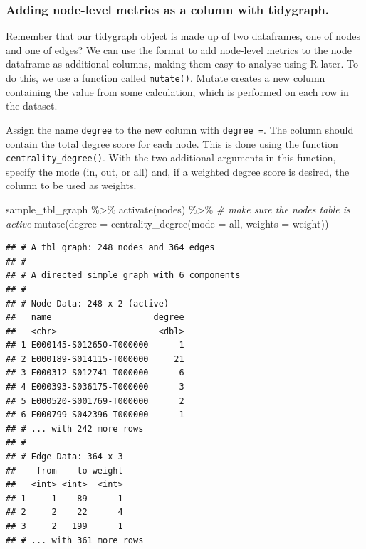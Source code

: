\documentclass[
]{book}
\newenvironment{Shaded}{\begin{snugshade}}{\end{snugshade}}
\newcommand{\AttributeTok}[1]{\textcolor[rgb]{0.77,0.63,0.00}{#1}}
\newcommand{\CommentTok}[1]{\textcolor[rgb]{0.56,0.35,0.01}{\textit{#1}}}
\newcommand{\FunctionTok}[1]{\textcolor[rgb]{0.00,0.00,0.00}{#1}}
\newcommand{\NormalTok}[1]{#1}
\newcommand{\SpecialCharTok}[1]{\textcolor[rgb]{0.00,0.00,0.00}{#1}}
\newcommand{\StringTok}[1]{\textcolor[rgb]{0.31,0.60,0.02}{#1}}
\begin{document}
\hypertarget{adding-node-level-metrics-as-a-column-with-tidygraph.}{%
\subsubsection{Adding node-level metrics as a column with tidygraph.}\label{adding-node-level-metrics-as-a-column-with-tidygraph.}}

Remember that our tidygraph object is made up of two dataframes, one of nodes and one of edges? We can use the format to add node-level metrics to the node dataframe as additional columns, making them easy to analyse using R later. To do this, we use a function called \texttt{mutate()}. Mutate creates a new column containing the value from some calculation, which is performed on each row in the dataset.

Assign the name \texttt{degree} to the new column with \texttt{degree\ =}. The column should contain the total degree score for each node. This is done using the function \texttt{centrality\_degree()}. With the two additional arguments in this function, specify the mode (in, out, or all) and, if a weighted degree score is desired, the column to be used as weights.

\begin{Shaded}
\begin{Highlighting}[]
\NormalTok{sample\_tbl\_graph }\SpecialCharTok{\%\textgreater{}\%} 
  \FunctionTok{activate}\NormalTok{(nodes) }\SpecialCharTok{\%\textgreater{}\%} \CommentTok{\# make sure the nodes table is active}
  \FunctionTok{mutate}\NormalTok{(}\AttributeTok{degree =} \FunctionTok{centrality\_degree}\NormalTok{(}\AttributeTok{mode =} \StringTok{\textquotesingle{}all\textquotesingle{}}\NormalTok{, }\AttributeTok{weights =}\NormalTok{ weight))}
\end{Highlighting}
\end{Shaded}

\begin{verbatim}
## # A tbl_graph: 248 nodes and 364 edges
## #
## # A directed simple graph with 6 components
## #
## # Node Data: 248 x 2 (active)
##   name                    degree
##   <chr>                    <dbl>
## 1 E000145-S012650-T000000      1
## 2 E000189-S014115-T000000     21
## 3 E000312-S012741-T000000      6
## 4 E000393-S036175-T000000      3
## 5 E000520-S001769-T000000      2
## 6 E000799-S042396-T000000      1
## # ... with 242 more rows
## #
## # Edge Data: 364 x 3
##    from    to weight
##   <int> <int>  <int>
## 1     1    89      1
## 2     2    22      4
## 3     2   199      1
## # ... with 361 more rows
\end{verbatim}
\end{document}

